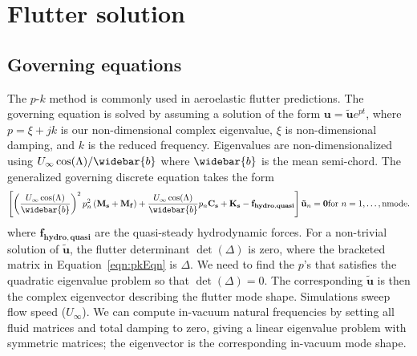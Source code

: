 \documentclass[10pt]{article}
\newcommand{\mbf}[1]{\mathbf{#1}}
\newcommand{\Uinf}{U_{\infty}}
\newcommand{\tn}[1]{\textrm{#1}}
\begin{document}
\section{Flutter solution}
\subsection{Governing equations}
% 
The $p$-$k$ method is commonly used in aeroelastic flutter predictions.
The governing equation is solved by assuming a solution of the form
$    \mbf{u} = \tilde{\mbf{u}}e^{pt}$,
%
where $p=\xi + j k$ is our non-dimensional complex eigenvalue, $\xi$ is non-dimensional damping, and $k$ is the reduced frequency.
Eigenvalues are non-dimensionalized using $\Uinf \cos(\Lambda)/\widebar{b}$ where $\widebar{b}$ is the mean semi-chord.
The generalized governing discrete equation takes the form
\begin{multline}
	\label{eqn:pkEqn}
	\left[
		\left( \frac{\Uinf\cos(\Lambda)}{\widebar{b}} \right)^2
		p_n^2\left(   \mbf{M_s}   + \mbf{M_f}\right)
		+ \frac{\Uinf\cos(\Lambda)}{\widebar{b}}
		p_n\mbf{C_s}
		+ \mbf{K_s}
		- \mbf{f_{hydro,quasi}}
		\right]
	\mbf{\tilde{u}}_n = \mbf{0}
	\hfill
	\tn{for }n = 1,\ldots,\tn{nmode}.
\end{multline}
where $\mbf{f_{hydro,quasi}}$ are the quasi-steady hydrodynamic forces.
For a non-trivial solution of $\mbf{\tilde{u}}$, the flutter determinant $\det(\Delta)$ is zero, where the bracketed matrix in Equation~\eqref{eqn:pkEqn} is $\Delta$.
We need to find the $p$'s that satisfies the quadratic eigenvalue problem so that $\det(\Delta) = 0$.
The corresponding $\mbf{\tilde{u}}$ is then the complex eigenvector describing the flutter mode shape.
Simulations sweep flow speed ($\Uinf$).
We can compute in-vacuum natural frequencies by setting all fluid matrices and total damping to zero, giving a linear eigenvalue problem with symmetric matrices;
the eigenvector is the corresponding in-vacuum mode shape.
\end{document}
